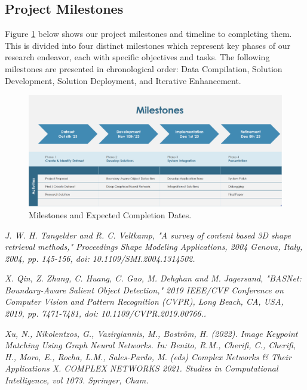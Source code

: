 \documentclass[letter,10pt]{article}
\begin{document}
\begin{multicols}{2}
		
  
        \section{Project Milestones}
		Figure \ref{fig:milestones} below shows our project milestones and timeline to completing them. This is divided into four distinct milestones which represent key phases of our research endeavor, each with specific objectives and tasks. The following milestones are presented in chronological order: Data Compilation, Solution Development, Solution Deployment, and Iterative Enhancement.
        \par
        
        \begin{figure}[htb]
            \centering
            \includegraphics[width=\textwidth]{images/ProjectMilestones.png}
            \caption{Milestones and Expected Completion Dates.}
            \label{fig:milestones}
        \end{figure}

		\begin{thebibliography}{3}
			\textit{J. W. H. Tangelder and R. C. Veltkamp, "A survey of content based 3D shape retrieval methods," Proceedings Shape Modeling Applications, 2004 Genova, Italy, 2004, pp. 145-156, doi: 10.1109/SMI.2004.1314502.}

			\textit{X. Qin, Z. Zhang, C. Huang, C. Gao, M. Dehghan and M. Jagersand, "BASNet: Boundary-Aware Salient Object Detection," 2019 IEEE/CVF Conference on     Computer Vision and Pattern Recognition (CVPR), Long Beach, CA, USA, 2019, pp. 7471-7481, doi: 10.1109/CVPR.2019.00766..}

                \textit{Xu, N., Nikolentzos, G., Vazirgiannis, M., Boström, H. (2022). Image Keypoint Matching Using Graph Neural Networks. In: Benito, R.M., Cherifi, C., Cherifi, H., Moro, E., Rocha, L.M., Sales-Pardo, M. (eds) Complex Networks & Their Applications X. COMPLEX NETWORKS 2021. Studies in Computational Intelligence, vol 1073. Springer, Cham.}

		\end{thebibliography}
	\end{multicols}
\end{document}
